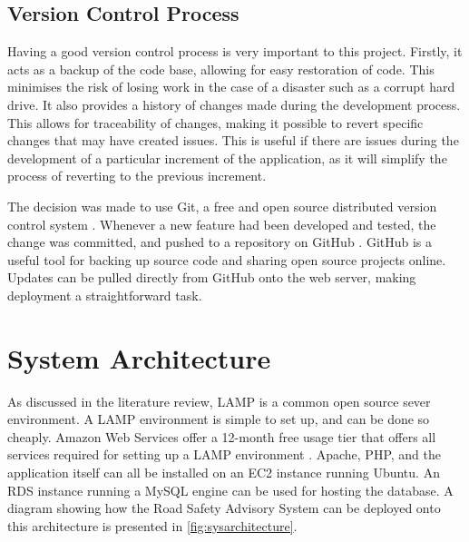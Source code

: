 \documentclass[authoryearcitations]{UoYCSproject}
\begin{document}
\subsection{Version Control Process}

Having a good version control process is very important to this project. Firstly, it acts as a backup of the code base, allowing for easy restoration of code. This minimises the risk of losing work in the case of a disaster such as a corrupt hard drive. It also provides a history of changes made during the development process. This allows for traceability of changes, making it possible to revert specific changes that may have created issues. This is useful if there are issues during the development of a particular increment of the application, as it will simplify the process of reverting to the previous increment.

The decision was made to use Git, a free and open source distributed version control system \citep{Git}. Whenever a new feature had been developed and tested, the change was committed, and pushed to a repository on GitHub \citep{GitHub}. GitHub is a useful tool for backing up source code and sharing open source projects online. Updates can be pulled directly from GitHub onto the web server, making deployment a straightforward task.

\section{System Architecture}

As discussed in the literature review, LAMP is a common open source sever environment. A LAMP environment is simple to set up, and can be done so cheaply. Amazon Web Services offer a 12-month free usage tier that offers all services required for setting up a LAMP environment \citep{AmazonWebServices}. Apache, PHP, and the application itself can all be installed on an EC2 instance running Ubuntu. An RDS instance running a MySQL engine can be used for hosting the database. A diagram showing how the Road Safety Advisory System can be deployed onto this architecture is presented in \autoref{fig:sysarchitecture}.
\end{document}
